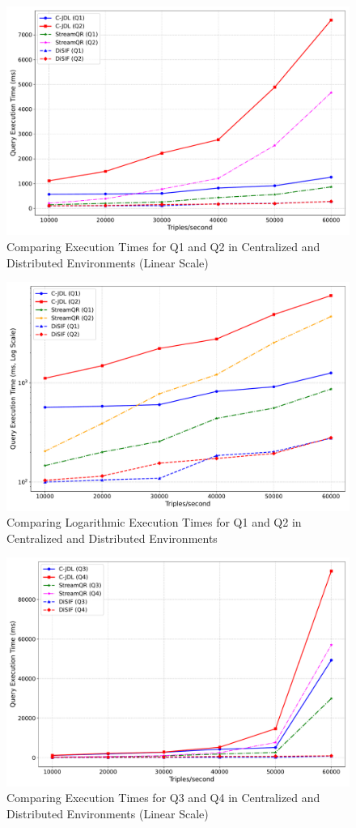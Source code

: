 \documentclass[5p,times]{elsarticle}
\begin{document}
\begin{itemize}
\begin{figure}[t] %
  \centering
  \includegraphics[width=0.8\columnwidth]{Time_execution_Q1Q2_StreamQR_NonLogarithmicAdjustment_LinearScale_Q1Q2.pdf}
  \caption{Comparing Execution Times for Q1 and Q2 in Centralized and Distributed Environments (Linear Scale)}
  \label{fig:Timeexperiment1}
\end{figure}

\begin{figure}[t] %
  \centering
  \includegraphics[width=0.8\columnwidth]{Time_execution_Q1Q2_StreamQR_NonLogarithmicAdjustment_LogScale_Q1Q2.pdf}
  \caption{Comparing Logarithmic Execution Times for Q1 and Q2 in Centralized and Distributed Environments}
  \label{fig:Timeexperiment2}
\end{figure}

\begin{figure}[t] %
  \centering
  \includegraphics[width=0.8\columnwidth]{Time_execution_Q1Q2_StreamQR_NonLogarithmicAdjustment_LinearScale_Q3Q4.pdf}
  \caption{Comparing Execution Times for Q3 and Q4 in Centralized and Distributed Environments (Linear Scale)}
  \label{fig:Timeexperiment3}
\end{figure}


\end{itemize}
\end{document}
